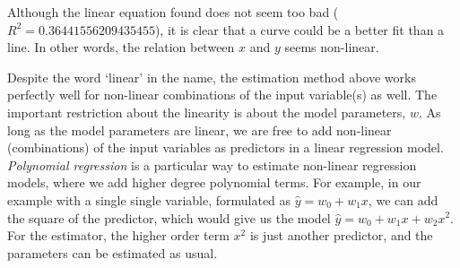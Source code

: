 Although the linear equation found does not seem too bad
($R^{2} = \num{0.36441556209435455}$),
it is clear that a curve could be a better fit than a line.
In other words, the relation between $x$ and $y$ seems non-linear.

Despite the word `linear' in the name,
the estimation method above works perfectly well
for non-linear combinations of the input variable(s) as well.
The important restriction about the linearity is
about the model parameters, $w$.
As long as the model parameters are linear,
we are free to add non-linear (combinations)
of the input variables as predictors in a linear regression model.
\emph{Polynomial regression} is a particular way
to estimate non-linear regression models,
where we add higher degree polynomial terms.
For example, in our example with a single single variable,
formulated as $\hat{y} = w_{0} + w_{1} x$,
we can add the square of the predictor,
which would give us the model $\hat{y} = w_{0} + w_{1} x + w_{2} x^{2}$.
For the estimator, the higher order term $x^{2}$ is just another predictor,
and the parameters can be estimated as usual.

